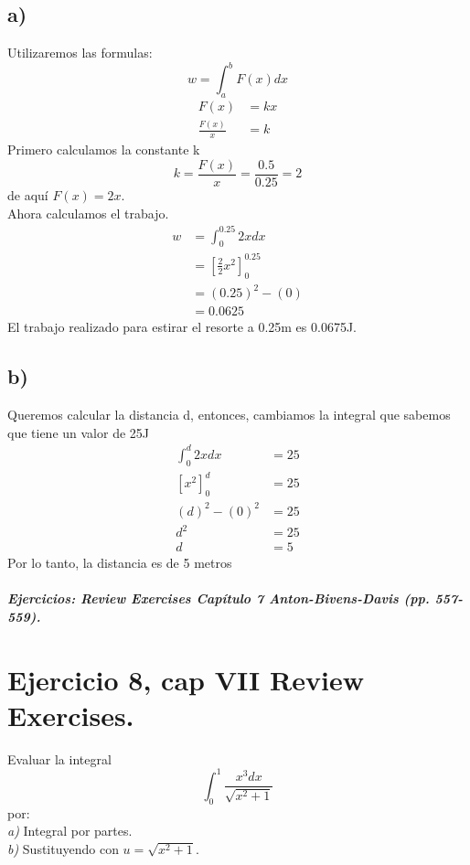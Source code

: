 \documentclass[11pt,letterpaper]{article}
\begin{document}
\subsection*{a)}
Utilizaremos las formulas:\\
\begin{equation*}
  w=\int_{a}^{b}F(x)dx
\end{equation*}
\begin{equation*}
  \begin{split}
    F(x) &= kx\\
    \frac{F(x)}{x} &= k
  \end{split}
\end{equation*}
Primero calculamos la constante k
\begin{equation*}
  k=\frac{F(x)}{x}=\frac{0.5}{0.25}=2
\end{equation*}
de aquí $F(x)=2x$.\\
Ahora calculamos el trabajo.
\begin{equation*}
  \begin{split}
    w &= \int_{0}^{0.25}2xdx\\
    &= \left[ \frac{2}{2}x^2\right]^{0.25}_{0}\\
    &=(0.25)^2-(0)\\
    &=0.0625
  \end{split}
\end{equation*}
El trabajo realizado para estirar el resorte a 0.25m es 0.0675J.

\subsection*{b)}
Queremos calcular la distancia d, entonces, cambiamos la integral que sabemos que tiene un valor de 25J
\begin{equation*}
  \begin{split}
    \int_{0}^{d}2xdx &= 25\\
        [x^2]_{0}^{d} &=25\\
        (d)^2-(0)^2 &=25\\
        d^2 &=25\\
        d&=5
  \end{split}
\end{equation*}
Por lo tanto, la distancia es de 5 metros

\subparagraph{Ejercicios: Review Exercises Capítulo 7 Anton-Bivens-Davis (pp. 557-559).}

\section{Ejercicio 8, cap VII Review Exercises.}
Evaluar la integral
\begin{equation*}
  \int_{0}^{1} \frac{x^3dx}{\sqrt{x^2+1}}
\end{equation*}
por:\\
\textit{a)} Integral por partes.\\
\textit{b)} Sustituyendo con $u=\sqrt{x^2+1}$.
\end{document}
